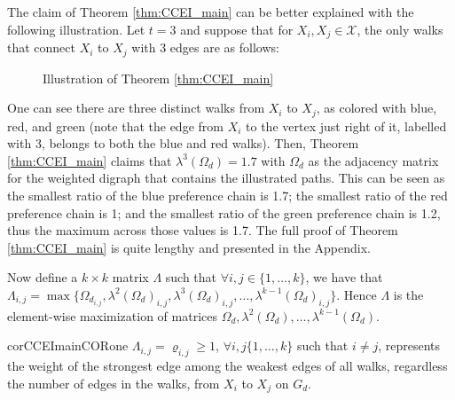\documentclass{article} %
\theoremstyle{style1}
\theoremstyle{style1}
\theoremstyle{example}
\begin{document}
The claim of Theorem \ref{thm:CCEI_main} can be better explained with the following illustration. Let $t=3$ and suppose that for $X_i,X_j\in\mathcal{X}$, the only walks that connect $X_i$ to $X_j$ with 3 edges are as follows:
\begin{figure}[H]
\centering
{}
\caption{Illustration of Theorem \ref{thm:CCEI_main}} \label{fig:example1_graph}
\end{figure}
One can see there are three distinct walks from $X_i$ to $X_j$, as colored with blue, red, and green (note that the edge from $X_i$ to the vertex just right of it, labelled with 3, belongs to both the blue and red walks). Then, Theorem \ref{thm:CCEI_main} claims that $\lambda^3(\Omega_d) = 1.7$ with $\Omega_d$ as the adjacency matrix for the weighted digraph that contains the illustrated paths. This can be seen as the smallest ratio of the blue preference chain is 1.7; the smallest ratio of the red preference chain is 1; and the smallest ratio of the green preference chain is 1.2, thus the maximum across those values is 1.7. The full proof of Theorem \ref{thm:CCEI_main} is quite lengthy and presented in the Appendix.

Now define a $k\times k$ matrix $\Lambda$ such that $\forall i,j\in\{1,\ldots,k\}$, we have that $\Lambda_{i,j}=\max\{\Omega_{d_{i,j}},\lambda^2(\Omega_d)_{i,j},\lambda^3(\Omega_d)_{i,j},\ldots,\lambda^{k-1}(\Omega_d)_{i,j}\}$. Hence $\Lambda$ is the element-wise maximization of matrices $\Omega_{d},\lambda^2(\Omega_d),\ldots,\lambda^{k-1}(\Omega_d)$. 

\begin{restatable}{cor}{CCEImainCORone}\label{cor:CCEI_mainCor1}
$\Lambda_{i,j}=\varrho_{i,j}\geq1$, $\forall i,j\{1,\ldots,k\}$ such that $i\not=j$, represents the weight of the strongest edge among the weakest edges of all walks, regardless the number of edges in the walks, from $X_i$ to $X_j$ on $G_d$.
\end{restatable}
\end{document}
